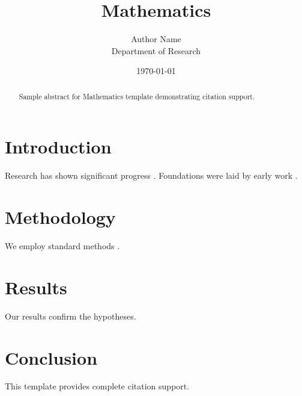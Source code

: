 \documentclass{mdpi}
\title{Mathematics}
\author{Author Name \\ \small Department of Research}
\date{\today}
\begin{document}
\maketitle

\begin{abstract}
Sample abstract for Mathematics template demonstrating citation support.
\end{abstract}

\section{Introduction}
Research has shown significant progress \citep{einstein1905}. Foundations were laid by early work \citep{turing1950}.

\section{Methodology}
We employ standard methods \citep{knuth1984}.

\section{Results}
Our results confirm the hypotheses.

\section{Conclusion}
This template provides complete citation support.



\end{document}

